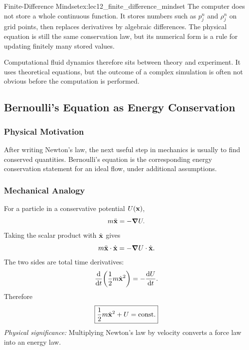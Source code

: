 \documentclass[../main.tex]{subfiles}
\begin{document}
\begin{Example}{Finite-Difference Mindset}{ex:lec12_finite_difference_mindset}
The computer does not store a whole continuous function. It stores numbers such as $p_j^n$ and $\rho_j^n$ on grid points, then replaces derivatives by algebraic differences. The physical equation is still the same conservation law, but its numerical form is a rule for updating finitely many stored values.
\end{Example}

Computational fluid dynamics therefore sits between theory and experiment. It uses theoretical equations, but the outcome of a complex simulation is often not obvious before the computation is performed.

\subsection{Bernoulli's Equation as Energy Conservation}\label{sec:lec12:bernoulli}

\subsubsection*{Physical Motivation}
After writing Newton's law, the next useful step in mechanics is usually to find conserved quantities. Bernoulli's equation is the corresponding energy conservation statement for an ideal flow, under additional assumptions.

\subsubsection{Mechanical Analogy}\label{subsec:lec12:mechanical-analogy}
For a particle in a conservative potential $U(\mathbf{x})$,
\begin{equation}
  m\ddot{\mathbf{x}}=-\grad U.
  \label{eq:lec12_particle_newton}
\end{equation}
Taking the scalar product with $\dot{\mathbf{x}}$ gives
\begin{equation}
  m\ddot{\mathbf{x}}\cdot\dot{\mathbf{x}}
  =
  -\grad U\cdot\dot{\mathbf{x}}.
  \label{eq:lec12_particle_energy_1}
\end{equation}
The two sides are total time derivatives:
\begin{equation}
  \dv{}{t}\qty(\frac{1}{2}m\dot{\mathbf{x}}^2)
  =
  -\dv{U}{t}.
  \label{eq:lec12_particle_energy_2}
\end{equation}
Therefore
\begin{equation}
  \boxed{
  \frac{1}{2}m\dot{\mathbf{x}}^2+U=\mathrm{const}.}
  \label{eq:lec12_particle_energy_conservation}
\end{equation}
\textit{Physical significance:} Multiplying Newton's law by velocity converts a force law into an energy law.
\end{document}
